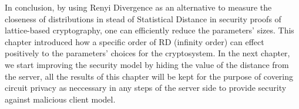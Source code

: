 In conclusion, by using Renyi Divergence as an alternative to measure the
closeness of distributions in stead of Statistical Distance in security proofs
of lattice-based cryptography, one can efficiently reduce the parameters'
sizes. This chapter introduced how a specific order of RD (infinity order) can
effect positively to the parameters' choices for the cryptosystem. In the next
chapter, we start improving the security model by hiding the value of the
distance from the server, all the results of this chapter will be kept for the
purpose of covering circuit privacy as neccessary in any steps of the server
side to provide security against malicious client model.


    
